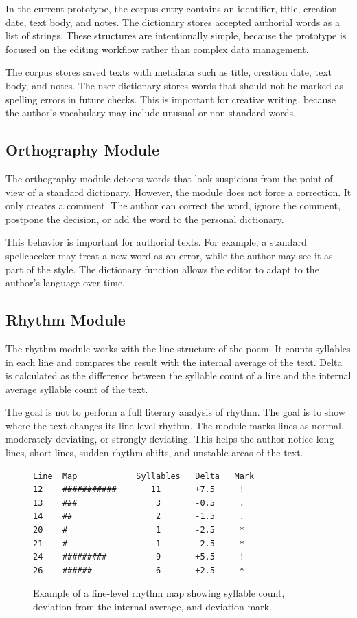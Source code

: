 \documentclass[sigconf]{acmart}
\begin{document}
In the current prototype, the corpus entry contains an identifier, title, creation date, text body, and notes. The dictionary stores accepted authorial words as a list of strings. These structures are intentionally simple, because the prototype is focused on the editing workflow rather than complex data management.

The corpus stores saved texts with metadata such as title, creation date, text body, and notes. The user dictionary stores words that should not be marked as spelling errors in future checks. This is important for creative writing, because the author's vocabulary may include unusual or non-standard words.

\subsection{Orthography Module}

The orthography module detects words that look suspicious from the point of view of a standard dictionary. However, the module does not force a correction. It only creates a comment. The author can correct the word, ignore the comment, postpone the decision, or add the word to the personal dictionary.

This behavior is important for authorial texts. For example, a standard spellchecker may treat a new word as an error, while the author may see it as part of the style. The dictionary function allows the editor to adapt to the author's language over time.

\subsection{Rhythm Module}

The rhythm module works with the line structure of the poem. It counts syllables in each line and compares the result with the internal average of the text. Delta is calculated as the difference between the syllable count of a line and the internal average syllable count of the text.

The goal is not to perform a full literary analysis of rhythm. The goal is to show where the text changes its line-level rhythm. The module marks lines as normal, moderately deviating, or strongly deviating. This helps the author notice long lines, short lines, sudden rhythm shifts, and unstable areas of the text.

\begin{figure}[h]
\begin{verbatim}
Line  Map            Syllables   Delta   Mark
12    ###########       11       +7.5     !
13    ###                3       -0.5     .
14    ##                 2       -1.5     .
20    #                  1       -2.5     *
21    #                  1       -2.5     *
24    #########          9       +5.5     !
26    ######             6       +2.5     *
\end{verbatim}
\caption{Example of a line-level rhythm map showing syllable count, deviation from the internal average, and deviation mark.}
\label{fig:rhythm-map}
\end{figure}
\end{document}
